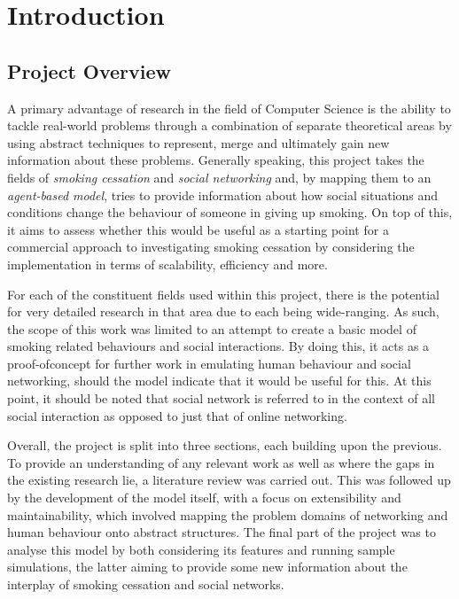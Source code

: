 \documentclass[]{report}
\begin{document}
\tableofcontents

%
%
\chapter{Introduction}

\section{Project Overview}
A primary advantage of research in the field of Computer Science is the ability to tackle real-world problems through a combination of separate theoretical areas by using abstract techniques to represent, merge and ultimately gain new information about these problems. Generally speaking, this project takes the fields of \emph{smoking cessation} and \emph{social networking} and, by mapping them to an \emph{agent-based model}, tries to provide information about how social situations and conditions change the behaviour of someone in giving up smoking. On top of this, it aims to assess whether this would be useful as a starting point for a commercial approach to investigating smoking cessation by considering the implementation in terms of scalability, efficiency and more. 

For each of the constituent fields used within this project, there is the potential for very detailed research in that area due to each being wide-ranging. As such, the scope of this work was limited to an attempt to create a basic model of smoking related behaviours and social interactions. By doing this, it acts as a proof-ofconcept for further work in emulating human behaviour and social networking, should the model indicate that it would be useful for this. At this point, it should be noted that social network is referred to in the context of all social interaction as opposed to just that of online networking. 

Overall, the project is split into three sections, each building upon the previous. To provide an understanding of any relevant work as well as where the gaps in the existing research lie, a literature review was carried out. This was followed up by the development of the model itself, with a focus on extensibility and maintainability, which involved mapping the problem domains of networking and human behaviour onto abstract structures. The final part of the project was to analyse this model by both considering its features and running sample simulations, the latter aiming to provide some new information about the interplay of smoking cessation and social networks.
\end{document}

